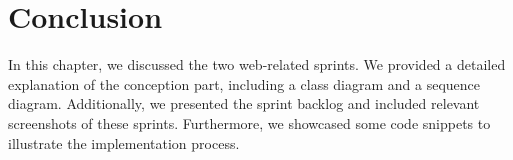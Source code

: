 \section{Conclusion}

In this chapter, we discussed the two web-related sprints. We provided a detailed explanation of the conception part, including a class diagram and a sequence diagram. Additionally, we presented the sprint backlog and included relevant screenshots of these sprints. Furthermore, we showcased some code snippets to illustrate the implementation process.